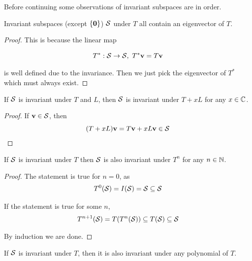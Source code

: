 Before continuing some observations of invariant subspaces are in order.


\begin{lemma}
    Invariant subspaces (except \(\{\mathbf{0}\}\)) \(\mathcal{S}\) under \(T\) all contain an eigenvector of \(T\).
\end{lemma}

\begin{proof}
     This is because the linear map

    \begin{equation*}
        T^*:\vsS\rightarrow \vsS,  \ T^*\vv=T\vv
    \end{equation*}

    is well defined due to the invariance. Then we just pick the eigenvector of \( T^* \) which must always exist.\footnotemark
\end{proof}


\begin{lemma}\label{lem:invariance_sum}
    If \(\mathcal{S}\) is invariant under \(T\) and \(L\), then \(\mathcal{S}\) is invariant under \(T+xL\) for any \(x\in\mathbb{C}\).
\end{lemma}
\begin{proof}
    If \(\mathbf{v}\in\mathcal{S}\), then
    \begin{equation*}
        (T+xL)\mathbf{v} = T\mathbf{v}+xL\mathbf{v} \in \mathcal{S}
    \end{equation*}
\end{proof}

\begin{lemma}\label{lem:invariance_power}
    If \(\mathcal{S}\) is invariant under \(T\) then \(\mathcal{S}\) is also invariant under \(T^n\) for any \(n\in\mathbb{N}\).
\end{lemma}
\begin{proof}
    The statement is true for \(n=0\), as
    \begin{equation*}
        T^0(\mathcal{S})=I(\mathcal{S})=\mathcal{S}\subseteq\mathcal{S}
    \end{equation*}

    If the statement is true for some \(n\),
    \begin{equation*}
        T^{n+1}(\mathcal{S})=T(T^n(\mathcal{S}))\subseteq T(\mathcal{S}) \subseteq \mathcal{S}
    \end{equation*}

    By induction we are done.
\end{proof}

\begin{corollary}\label{col:invariant_poly}
    If \(\mathcal{S}\) is invariant under \(T\), then it is also invariant under any polynomial of \(T\).
\end{corollary}

